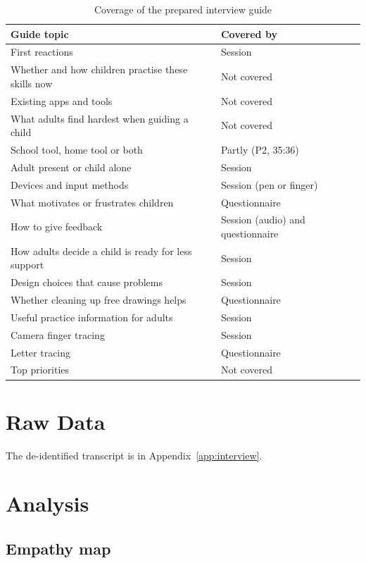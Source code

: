 \documentclass{article}
\begin{document}
\begin{table}[h]
\centering
\begin{tabularx}{\textwidth}{Xl}
\toprule
\textbf{Guide topic} & \textbf{Covered by} \\
\midrule
First reactions & Session \\
Whether and how children practise these skills now & Not covered \\
Existing apps and tools & Not covered \\
What adults find hardest when guiding a child & Not covered \\
School tool, home tool or both & Partly (P2, 35:36) \\
Adult present or child alone & Session \\
Devices and input methods & Session (pen or finger) \\
What motivates or frustrates children & Questionnaire \\
How to give feedback & Session (audio) and questionnaire \\
How adults decide a child is ready for less support & Session \\
Design choices that cause problems & Session \\
Whether cleaning up free drawings helps & Questionnaire \\
Useful practice information for adults & Session \\
Camera finger tracing & Session \\
Letter tracing & Questionnaire \\
Top priorities & Not covered \\
\bottomrule
\end{tabularx}
\caption{Coverage of the prepared interview guide}
\label{tbl:coverage}
\end{table}

\section{Raw Data}

The de-identified transcript is in Appendix~\ref{app:interview}.

\section{Analysis}

\subsection{Empathy map}
\end{document}
